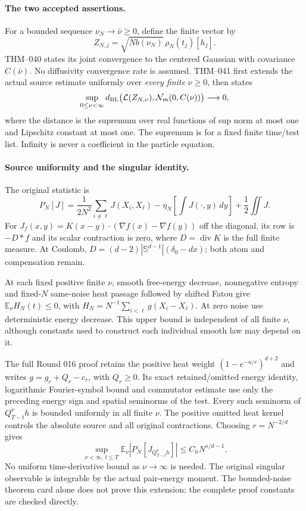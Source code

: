 \documentclass[10pt]{article}
\newcommand{\E}{\mathbb E}
\begin{document}
\paragraph{The two accepted assertions.}
For a bounded sequence $\nu_N\to\bar\nu\ge0$, define the finite vector by
\[ Z_{N,j}=\sqrt{Nb(\nu_N)}\,\rho_N(t_j)[h_j]. \]
THM--040 states its joint convergence to the centered Gaussian with covariance $C(\bar\nu)$. No diffusivity convergence rate is assumed.
THM--041 first extends the actual source estimate uniformly over \emph{every finite} $\nu\ge0$, then states
\[
 \sup_{0\le\nu<\infty}
 d_{\rm BL}\bigl(\mathcal L(Z_{N,\nu}),\mathcal N_m(0,C(\nu))\bigr)
 \longrightarrow0,
\]
where the distance is the supremum over real functions of sup norm at most one and Lipschitz constant at most one. The supremum is for a fixed finite time/test list. Infinity is never a coefficient in the particle equation.

\paragraph{Source uniformity and the singular identity.}
The original statistic is
\[
 P_N[J]=\frac1{2N^2}\sum_{i\ne\ell}J(X_i,X_\ell)
       -\eta_N\left[\int J(\cdot,y)\,dy\right]+\frac12\iint J.
\]
For $J_f(x,y)=K(x-y)\cdot(\nabla f(x)-\nabla f(y))$ off the diagonal, its row is $-D*f$ and its scalar contraction is zero, where $D=\operatorname{div}K$ is the full finite measure. At Coulomb,
$D=(d-2)|\mathbb S^{d-1}|(\delta_0-dx)$; both atom and compensation remain.

At each fixed positive finite $\nu$, smooth free-energy decrease, nonnegative entropy and fixed-$N$ same-noise heat passage followed by shifted Fatou give $\E_\nu H_N(t)\le0$, with $H_N=N^{-1}\sum_{i<\ell}g(X_i-X_\ell)$. At zero noise use deterministic energy decrease. This upper bound is independent of all finite $\nu$, although constants used to construct each individual smooth law may depend on it.

The full Round 016 proof retains the positive heat weight $(1-e^{-u/r})^{d+2}$ and writes $g=g_r+Q_r-c_r$, with $Q_r\ge0$. Its exact retained/omitted energy identity, logarithmic Fourier-symbol bound and commutator estimate use only the preceding energy sign and spatial seminorms of the test. Every such seminorm of $Q_{T-t}^\nu h$ is bounded uniformly in all finite $\nu$. The positive omitted heat kernel controls the absolute source and all original contractions. Choosing $r=N^{-2/d}$ gives
\[
 \sup_{\nu<\infty,\,t\le T}\E_\nu|P_N[J_{Q_{T-t}^\nu h}]|
 \le C_hN^{s/d-1}.
\]
No uniform time-derivative bound as $\nu\to\infty$ is needed. The original singular observable is integrable by the actual pair-energy moment. The bounded-noise theorem card alone does not prove this extension; the complete proof constants are checked directly.
\end{document}
